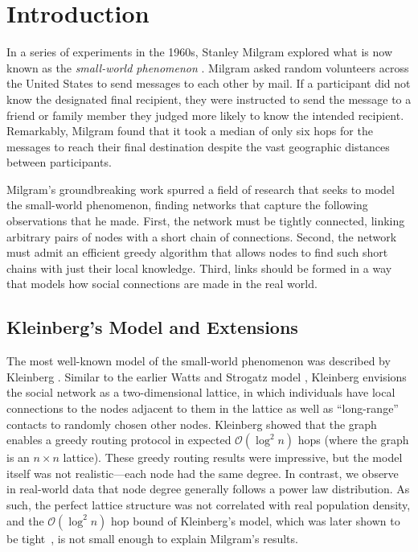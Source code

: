 \section{Introduction}

In a series of experiments in the 1960s, Stanley Milgram explored what is now
known as the \emph{small-world phenomenon}
\cite{milgram1967small,travers1977experimental}.
Milgram asked random volunteers across the United States to send messages to
each other by mail.
If a participant did not know the designated final recipient, they were
instructed to send the message to a friend or family member they judged more
likely to know the intended recipient.
Remarkably, Milgram found that it took a median of only six hops for the
messages to reach their final destination despite the vast geographic distances
between participants. 

Milgram's groundbreaking work spurred a field of research that seeks to model
the small-world phenomenon, finding networks that capture the following
observations that he made.
First, the network must be tightly connected, linking arbitrary pairs of nodes
with a short chain of connections.
Second, the network must admit an efficient greedy algorithm that allows nodes
to find such short chains with just their local knowledge.
Third, links should be formed in a way that models how social connections are made
in the real world.

\subsection{Kleinberg's Model and Extensions}

The most well-known model of the small-world phenomenon was described by
Kleinberg \cite{kleinberg2000small}.
Similar to the earlier Watts and Strogatz model \cite{watts1998collective},
Kleinberg envisions the social network as a two-dimensional lattice, in which
individuals have local connections to the nodes adjacent to them in the lattice
as well as ``long-range'' contacts to randomly chosen other nodes.
Kleinberg showed that the graph enables a greedy routing protocol in expected
$\mathcal{O}(\log^2 n)$ hops (where the graph is an $n \times n$ lattice).
These greedy routing results were impressive, but the model itself was not
realistic---each node had the same degree. In contrast, we observe in 
real-world data that node degree generally follows a power law distribution. 
As such, the perfect lattice structure was not
correlated with real population density, and the $\mathcal{O}(\log^2{n})$ hop bound
of Kleinberg's model, which was 
later shown to be tight~\cite{martel}, is not small enough to explain Milgram's
results.

